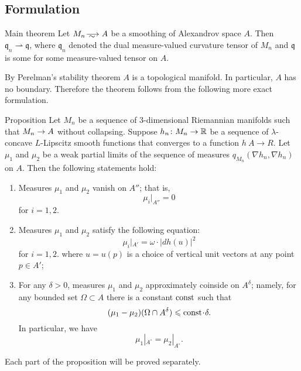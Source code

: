 

  


\subsection{Formulation}
  
\begin{thm}{Main theorem}\label{main}
Let $M_n\smooths{} A$ be a smoothing of Alexandrov space $A$.
Then $\mathfrak{q}_n\rightharpoonup \mathfrak{q}$, where $\mathfrak{q}_n$ denoted the dual measure-valued curvature tensor of $M_n$
and $\mathfrak{q}$ is some for some measure-valued tensor on $A$.
\end{thm}

By Perelman's stability theorem $A$ is a topological manifold.
In particular, $A$ has no boundary.
Therefore the theorem follows from the following more exact formulation.

\begin{thm}{Proposition}\label{prop:3parts}
Let $M_n$ be a sequence of $3$-dimensional Riemannian manifolds such that $M_n\zz\to A$ without collapsing.
Suppose $h_n\colon M_n\to\mathbb{R}$ be a sequence of $\lambda$-concave $L$-Lipscitz smooth functions that converges to a function $h\:A\to R$.
Let $\mu_1$ and $\mu_2$ be a weak partial limits of the sequence of measures $q_{M_n}(\nabla h_n,\nabla h_n)$ on $A$.
Then the following statements hold:
\begin{enumerate}
\item\label{prop:3parts:codim3} Measures $\mu_1$ and $\mu_2$ vanish on $A''$; that is, 
\[\mu_i|_{A''}=0\]
for $i=1,2$.
\item\label{prop:3parts:codim2} Measures $\mu_1$ and $\mu_2$ satisfy the following equation:
\[\mu_i|_{A'}=\omega\cdot |dh(u)|^2\]
for $i=1,2$.
where $u=u(p)$ is a choice of vertical unit vectors at any point $p\in A'$;
\item For any $\delta>0$, measures $\mu_1$ and $\mu_2$ approximately coinside on $A^\delta$;
namely, for any bounded set $\Omega\subset A$ there is a constant $\mathrm{const}$ such that 
\[(\mu_1-\mu_2)(\Omega\cap A^\delta)\le \const\cdot \delta.\]
In particular, we have
\[\mu_1|_{A^\circ}=\mu_2|_{A^\circ}.\]
\end{enumerate}
\end{thm}

Each part of the proposition will be proved separately.
